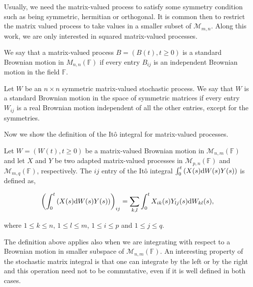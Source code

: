 Usually, we need the matrix-valued process to satisfy some symmetry condition such as being symmetric, hermitian or orthogonal. It is common then to restrict the matrix valued process to take values in a smaller subset of $\mathcal M_{m,n}$. Along this work, we are only interested in squared matrix-valued processes.

\begin{example}
    We say that a matrix-valued process $B = (B(t), t \ge 0)$ is a standard Brownian motion in $M_{n,n}(\mathbb F)$ if every entry $B_{ij}$ is an independent Brownian motion in the field $\mathbb F$.
\end{example}

\begin{example}
    Let $W$ be an $n\times n$ symmetric matrix-valued stochastic process. We say that $W$ is a standard Brownian motion in the space of symmetric matrices if every entry $W_{ij}$ is a real Brownian motion independent of all the other entries, except for the symmetries.
\end{example}


Now we show the definition of the Itô integral for matrix-valued processes.

\begin{definition}
    Let $W = (W(t), t \ge 0)$ be a matrix-valued Brownian motion in $\mathcal M_{n,m}(\mathbb F)$ and let $X$ and $Y$ be two adapted matrix-valued processes in $\mathcal M_{p,n}(\mathbb F)$ and $\mathcal M_{m,q}(\mathbb F)$, respectively. The $ij$ entry of the Itô integral $\int_0^t \left(X(s)\mathrm d W(s) Y(s)\right)$ is defined as,

    \begin{equation*}
        \left( \int_0^t \left(X(s)\mathrm d W(s) Y(s)\right) \right)_{ij} = \sum_{k,l} \int_0^t X_{ik}(s)Y_{lj}(s) \mathrm d W_{kl}(s),
    \end{equation*}

    \noindent where $1 \le k \le n$, $1 \le l \le m$, $1 \le i \le p$ and $1 \le j \le q$. 
\end{definition}

The definition above applies also when we are integrating with respect to a Brownian motion in smaller subspace of $\mathcal M_{n,m}(\mathbb F)$. An interesting property of the stochastic matrix integral is that one can integrate by the left or by the right and this operation need not to be commutative, even if it is well defined in both cases. 

